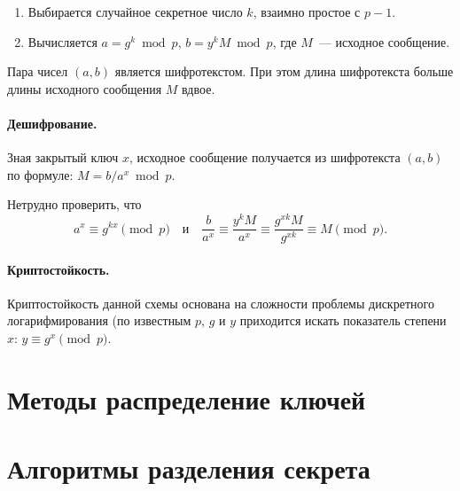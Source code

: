 \documentclass[a4paper,10pt]{article}
\begin{document}
\begin{enumerate}
   \item Выбирается случайное секретное число $k$, взаимно простое с $p - 1$.
   \item Вычисляется $a = g^k\bmod p$, $b = y^kM\bmod p$, где $M$~--- исходное сообщение.
\end{enumerate}

Пара чисел $(a,b)$ является шифротекстом. При этом длина шифротекста больше длины исходного сообщения $M$ вдвое.

\paragraph{Дешифрование.} 
Зная закрытый ключ $x$, исходное сообщение получается из шифротекста $(a,b)$ по формуле: $M = b / a^x\bmod p.$

Нетрудно проверить, что
$$a^x\equiv g^{kx}\pmod{p}\quad\text{и}\quad\frac{b}{a^x}\equiv \frac{y^kM}{a^x}\equiv \frac{g^{xk}M}{g^{xk}}\equiv M \pmod{p}.$$

\paragraph{Криптостойкость.} 
Криптостойкость данной схемы основана на сложности проблемы дискретного логарифмирования (по известным $p$, $g$ и $y$ приходится искать показатель
степени $x$: $y \equiv g^x \pmod{p}.$


\section{Методы распределение ключей} 
\section{Алгоритмы разделения секрета}
\end{document}
